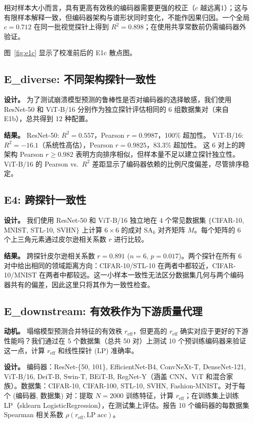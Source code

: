 \documentclass{article}
\newcommand{\reff}{\ensuremath{r_{\mathrm{eff}}}\xspace}
\newcommand{\SAk}{\ensuremath{\mathrm{SA}_k}\xspace}
\begin{document}
相对样本大小而言，具有更高有效秩的编码器需要更强的校正（$c$ 越远离1）；这与有限样本解释一致，但编码器架构与谱形状同时变化，不能作因果归因。一个全局 $c=0.712$ 在同一批视觉探针上得到 $R^2=0.898$；在使用共享常数前仍需编码器外验证。

图~\ref{fig:e1c} 显示了校准前后的 E1c 散点图。

\subsection{E\_diverse: 不同架构探针一致性}
\label{sec:ediverse}

\textbf{设计。} 为了测试崩溃模型预测的鲁棒性是否对编码器的选择敏感，我们使用 ResNet-50 和 ViT-B/16 分别作为独立探针评估相同的 6 组数据集对（来自 E1b），总共得到 12 种配置。

\textbf{结果。} ResNet-50: $R^2=0.557$，Pearson $r=0.9987$，100\% 超加性。
ViT-B/16: $R^2=-16.1$（系统性高估），Pearson $r=0.9825$，83.3\% 超加性。
这 6 对上的跨架构 Pearson $r\geq0.982$ 表明方向排序相似，但样本量不足以建立探针独立性。
ViT-B/16 的 Pearson vs.\ $R^2$ 差距显示了编码器依赖的比例尺度偏差，尽管排序稳定。
\subsection{E4: 跨探针一致性}
\label{sec:e4}

\textbf{设计。}
我们使用 ResNet-50 和 ViT-B/16 独立地在 4 个常见数据集 $\{$CIFAR-10, MNIST, STL-10, SVHN$\}$ 上计算 $6\times6$ 的成对 $\SAk$ 对齐矩阵 $M$。每个矩阵的 6 个上三角元素通过皮尔逊相关系数 $r$ 进行比较。

\textbf{结果。}
跨探针皮尔逊相关系数 $r=0.891$ ($n=6$, $p=0.017$)。两个探针在所有 6 对中给出相同的领域距离方向：CIFAR-10/STL-10 在两者中都较近，CIFAR-10/MNIST 在两者中都较远。这一小样本一致性无法区分数据集几何与两个编码器共有的偏差，因此这里只将其作为一致性检查。

\subsection{E\_downstream: 有效秩作为下游质量代理}
\label{sec:edownstream}

\textbf{动机。}
塌缩模型预测合并特征的有效秩 $\reff$，但更高的 $\reff$ 确实对应于更好的下游性能吗？我们通过在 5 个数据集（总共 50 对）上测试 10 个预训练编码器来验证这一点，计算 $\reff$ 和线性探针 (LP) 准确率。

\textbf{设计。}
编码器：ResNet-\{50, 101\}, EfficientNet-B4, ConvNeXt-T, DenseNet-121, ViT-B/16, DeiT-B, Swin-T, BEiT-B, RegNet-Y（涵盖 CNN、ViT 和混合家族）。数据集：CIFAR-10, CIFAR-100, STL-10, SVHN, Fashion-MNIST。对于每个 (编码器, 数据集) 对：提取 $N=2000$ 训练特征，计算 $\reff$；在训练集上训练 LP（sklearn LogisticRegression），在测试集上评估。报告 10 个编码器的每数据集 Spearman 相关系数 $\rho(\reff, \mathrm{LP\;acc})$。
\end{document}
